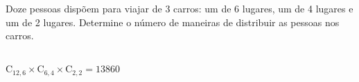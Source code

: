 \begin{ex}
 Doze pessoas dispõem para viajar de 3 carros: um de 6 lugares, um de 4 lugares e um de 2 lugares. Determine o número de maneiras de distribuir as pessoas nos carros.
  \begin{sol}
      \phantom{A} \\
  $\text{C}_{{12},6}\times \text{C}_{6,4}\times \text{C}_{2,2}=13860$
  \end{sol}
\end{ex}